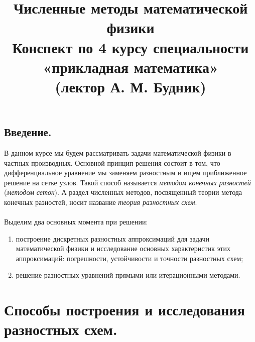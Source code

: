 \documentclass[a4paper, 12pt]{report}
\title{\textbf{\Huge{Численные методы математической физики}}\\Конспект по 4 курсу 
	специальности «прикладная математика»\\(лектор А. М. Будник)}
\date{}
\numberwithin{equation}{section}
\begin{document}
	\maketitle
	\tableofcontents{}
	\newpage
	\section*{Введение.}
	В данном курсе мы будем рассматривать задачи математической физики в частных производных. Основной принцип решения состоит в том, что дифференциальное уравнение мы заменяем разностным и ищем приближенное решение на сетке узлов. Такой способ называется \textit{методом конечных разностей} (\textit{методом сеток}). А раздел численных методов, посвященный теории метода конечных разностей, носит название \textit{теория разностных схем}. 
	\\\\
	Выделим два основных момента при решении:
	\begin{enumerate}
		\item построение дискретных разностных аппроксимаций для задачи математической физики и исследование основных характеристик этих аппроксимаций: погрешности, устойчивости и точности разностных схем;
		\item решение разностных уравнений прямыми или итерационными методами.
	\end{enumerate}
	\chapter{Способы построения и исследования разностных схем.}
\end{document}
